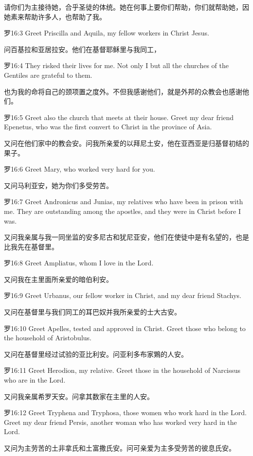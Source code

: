 \documentclass[a4paper,11pt,onecolumn,twoside]{ctexart}
\begin{document}
\begin{multicols}{2}
 请你们为主接待她，合乎圣徒的体统。她在何事上要你们帮助，你们就帮助她，因她素来帮助许多人，也帮助了我。


 罗16:3
 Greet Priscilla and Aquila, my fellow workers in Christ Jesus.

 问百基拉和亚居拉安。他们在基督耶稣里与我同工，


 罗16:4
 They risked their lives for me. Not only I but all the churches of the Gentiles are grateful to them.

 也为我的命将自己的颈项置之度外。不但我感谢他们，就是外邦的众教会也感谢他们。


 罗16:5
 Greet also the church that meets at their house. Greet my dear friend Epenetus, who was the first convert to Christ in the province of Asia.

 又问在他们家中的教会安。问我所亲爱的以拜尼土安，他在亚西亚是归基督初结的果子。


 罗16:6
 Greet Mary, who worked very hard for you.

 又问马利亚安，她为你们多受劳苦。


 罗16:7
 Greet Andronicus and Junias, my relatives who have been in prison with me. They are outstanding among the apostles, and they were in Christ before I was.

 又问我亲属与我一同坐监的安多尼古和犹尼亚安，他们在使徒中是有名望的，也是比我先在基督里。


 罗16:8
 Greet Ampliatus, whom I love in the Lord.

 又问我在主里面所亲爱的暗伯利安。


 罗16:9
 Greet Urbanus, our fellow worker in Christ, and my dear friend Stachys.

 又问在基督里与我们同工的耳巴奴并我所亲爱的士大古安。


 罗16:10
 Greet Apelles, tested and approved in Christ. Greet those who belong to the household of Aristobulus.

 又问在基督里经过试验的亚比利安。问亚利多布家鶪的人安。


 罗16:11
 Greet Herodion, my relative. Greet those in the household of Narcissus who are in the Lord.

 又问我亲属希罗天安。问拿其数家在主里的人安。


 罗16:12
 Greet Tryphena and Tryphosa, those women who work hard in the Lord. Greet my dear friend Persis, another woman who has worked very hard in the Lord.

 又问为主劳苦的土非拿氏和土富撒氏安。问可亲爱为主多受劳苦的彼息氏安。



\end{multicols}
\end{document}

